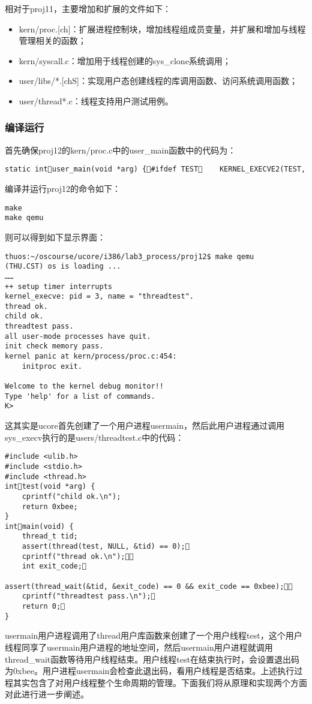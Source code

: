 相对于proj11，主要增加和扩展的文件如下：

\begin{itemize}
\tightlist
\item
  kern/proc.{[}ch{]}：扩展进程控制块，增加线程组成员变量，并扩展和增加与线程管理相关的函数；
\item
  kern/syscall.c：增加用于线程创建的sys\_clone系统调用；
\item
  user/libs/*.{[}chS{]}：实现用户态创建线程的库调用函数、访问系统调用函数；
\item
  user/thread*.c：线程支持用户测试用例。
\end{itemize}

\subsubsection{编译运行}\label{ux7f16ux8bd1ux8fd0ux884c}

首先确保proj12的kern/proc.c中的user\_main函数中的代码为：

\begin{lstlisting}
static intuser_main(void *arg) {#ifdef TEST    KERNEL_EXECVE2(TEST, TESTSTART, TESTSIZE);#else    KERNEL_EXECVE(threadtest);#endif    panic("user_main execve failed.\n");}
\end{lstlisting}

编译并运行proj12的命令如下：

\begin{lstlisting}
make
make qemu
\end{lstlisting}

则可以得到如下显示界面：

\begin{lstlisting}
thuos:~/oscourse/ucore/i386/lab3_process/proj12$ make qemu
(THU.CST) os is loading ...
……
++ setup timer interrupts
kernel_execve: pid = 3, name = "threadtest".
thread ok.
child ok.
threadtest pass.
all user-mode processes have quit.
init check memory pass.
kernel panic at kern/process/proc.c:454:
    initproc exit.

Welcome to the kernel debug monitor!!
Type 'help' for a list of commands.
K>
\end{lstlisting}

这其实是ucore首先创建了一个用户进程usermain，然后此用户进程通过调用sys\_execv执行的是users/threadtest.c中的代码：

\begin{lstlisting}
#include <ulib.h>
#include <stdio.h>
#include <thread.h>
inttest(void *arg) {
    cprintf("child ok.\n");
    return 0xbee;
}
intmain(void) {
    thread_t tid;
    assert(thread(test, NULL, &tid) == 0);   
    cprintf("thread ok.\n");    
    int exit_code;    
    assert(thread_wait(&tid, &exit_code) == 0 && exit_code == 0xbee);    
    cprintf("threadtest pass.\n");    
    return 0;
}
\end{lstlisting}

usermain用户进程调用了thread用户库函数来创建了一个用户线程test，这个用户线程同享了usermain用户进程的地址空间，然后usermain用户进程就调用thread\_wait函数等待用户线程结束。用户线程test在结束执行时，会设置退出码为0xbee。用户进程usermain会检查此退出码，看用户线程是否结束。上述执行过程其实包含了对用户线程整个生命周期的管理。下面我们将从原理和实现两个方面对此进行进一步阐述。
